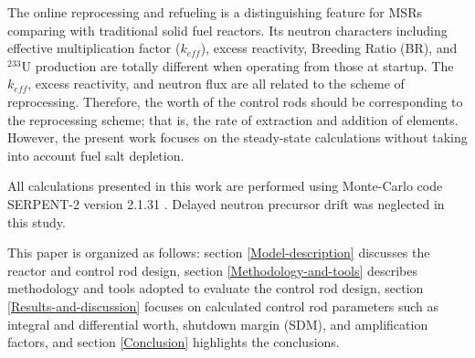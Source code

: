 The online reprocessing and refueling is a distinguishing feature for MSRs comparing with traditional solid fuel reactors. Its neutron characters including effective multiplication factor ($k_{eff}$), excess reactivity, Breeding Ratio (BR), and $^{233}$U production are totally different when operating from those at startup. The $k_{eff}$, excess reactivity, and neutron flux are all related to the scheme of reprocessing. Therefore, the worth of the control rods should be corresponding to the reprocessing scheme; that is, the rate of extraction and addition of elements. However, the present work focuses on the steady-state calculations without taking into account fuel salt depletion.

All calculations presented in this work are performed using Monte-Carlo code SERPENT-2 version 2.1.31 \cite{leppanen2014serpent}. Delayed neutron precursor drift was neglected in this study.

This paper is organized as follows: section \ref{Model-description} discusses the reactor and control rod design, section \ref{Methodology-and-tools} describes methodology and tools adopted to evaluate the control rod design, section \ref{Results-and-discussion} focuses on calculated control rod parameters such as integral and differential worth, shutdown margin (SDM), and amplification factors, and section \ref{Conclusion} highlights the conclusions.